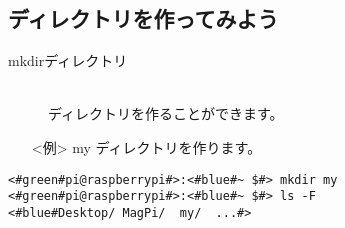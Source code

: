 \subsection{ディレクトリを作ってみよう}
\begin{description}
\item[mkdir\textvisiblespace ディレクトリ]\mbox{}\\
ディレクトリを作ることができます。
\end{description}
\begin{itemize}
\item[<例>]my ディレクトリを作ります。
\end{itemize}
\begin{lstlisting}[caption=mkdirの例, label=mkdir]
<#green#pi@raspberrypi#>:<#blue#~ $#> mkdir my
<#green#pi@raspberrypi#>:<#blue#~ $#> ls -F
<#blue#Desktop/	MagPi/	my/	 ...#>
\end{lstlisting}
\begin{tcolorbox}[title=\useOmetoi]
\begin{enumerate}
\end{enumerate}
\end{tcolorbox}
